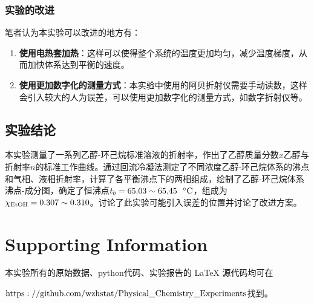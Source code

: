 \documentclass[12pt]{article}
\begin{document}
					\subsubsection{实验的改进}
					笔者认为本实验可以改进的地方有：
					\begin{enumerate}
						\item \textbf{使用电热套加热}：这样可以使得整个系统的温度更加均匀，减少温度梯度，从而加快体系达到平衡的速度。\par
						\item \textbf{使用更加数字化的测量方式}：本实验中使用的阿贝折射仪需要手动读数，这样会引入较大的人为误差，可以使用更加数字化的测量方式，如数字折射仪等。\par
					\end{enumerate}
				\subsection{实验结论}
				本实验测量了一系列乙醇-环己烷标准溶液的折射率，作出了乙醇质量分数$x$乙醇与折射率$n$的标准工作曲线。通过回流冷凝法测定了不同浓度乙醇-环己烷体系的沸点和气相、液相折射率，计算了各平衡沸点下的两相组成，绘制了乙醇-环己烷体系沸点-成分图，确定了恒沸点$t_{b}=65.03\sim 65.45\ \ {\rm ^{\circ}C}$，组成为$\chi_{\ce{EtOH}}=0.307 \sim 0.310$。讨论了此实验可能引入误差的位置并讨论了改进方案。


					



	\vbox{}
	\section{Supporting Information}
		本实验所有的原始数据、python代码、实验报告的 LaTeX 源代码均可在\par
		 $\rm{https://github.com/wzhstat/Physical\_Chemistry\_Experiments}$找到。
\vbox{}  


\end{document}
